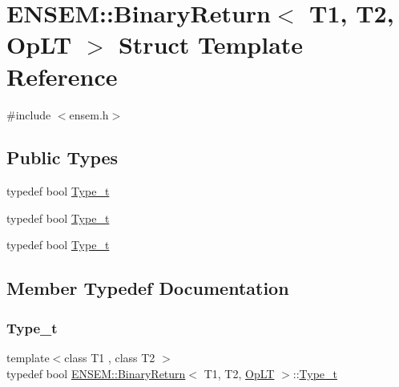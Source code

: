 \hypertarget{structENSEM_1_1BinaryReturn_3_01T1_00_01T2_00_01OpLT_01_4}{}\section{E\+N\+S\+EM\+:\+:Binary\+Return$<$ T1, T2, Op\+LT $>$ Struct Template Reference}
\label{structENSEM_1_1BinaryReturn_3_01T1_00_01T2_00_01OpLT_01_4}


{\ttfamily \#include $<$ensem.\+h$>$}

\subsection*{Public Types}
\begin{DoxyCompactItemize}
\item 
typedef bool \mbox{\hyperlink{structENSEM_1_1BinaryReturn_3_01T1_00_01T2_00_01OpLT_01_4_a5617c2e3cf4124ac0b4d777ae1a195ec}{Type\+\_\+t}}
\item 
typedef bool \mbox{\hyperlink{structENSEM_1_1BinaryReturn_3_01T1_00_01T2_00_01OpLT_01_4_a5617c2e3cf4124ac0b4d777ae1a195ec}{Type\+\_\+t}}
\item 
typedef bool \mbox{\hyperlink{structENSEM_1_1BinaryReturn_3_01T1_00_01T2_00_01OpLT_01_4_a5617c2e3cf4124ac0b4d777ae1a195ec}{Type\+\_\+t}}
\end{DoxyCompactItemize}


\subsection{Member Typedef Documentation}
\mbox{\label{structENSEM_1_1BinaryReturn_3_01T1_00_01T2_00_01OpLT_01_4_a5617c2e3cf4124ac0b4d777ae1a195ec}} 
\subsubsection{\texorpdfstring{Type\_t}{Type\_t}\hspace{0.1cm}{\footnotesize\ttfamily [1/3]}}
{\footnotesize\ttfamily template$<$class T1 , class T2 $>$ \\
typedef bool \mbox{\hyperlink{structENSEM_1_1BinaryReturn}{E\+N\+S\+E\+M\+::\+Binary\+Return}}$<$ T1, T2, \mbox{\hyperlink{structENSEM_1_1OpLT}{Op\+LT}} $>$\+::\mbox{\hyperlink{structENSEM_1_1BinaryReturn_3_01T1_00_01T2_00_01OpLT_01_4_a5617c2e3cf4124ac0b4d777ae1a195ec}{Type\+\_\+t}}}

